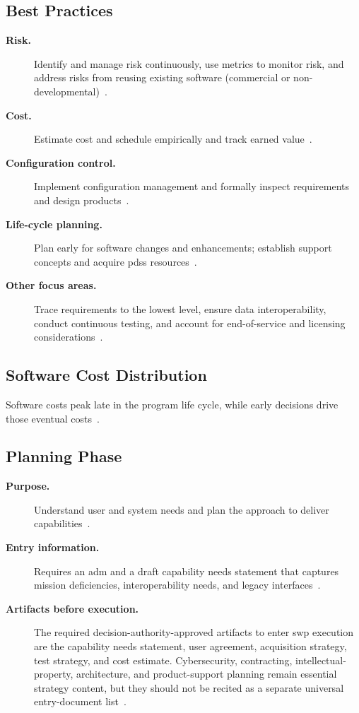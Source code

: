 \documentclass[../main.tex]{subfiles}
\begin{document}
\subsection{Best Practices}
\begin{description}
  \item[\textbf{Risk.}] Identify and manage risk continuously, use metrics to monitor risk, and address risks from reusing existing software (commercial or non-developmental)~\autocite{edo-3-4-2-software-acquisition-management-2025}.
  \item[\textbf{Cost.}] Estimate cost and schedule empirically and track earned value~\autocite{edo-3-4-2-software-acquisition-management-2025}.
  \item[\textbf{Configuration control.}] Implement configuration management and formally inspect requirements and design products~\autocite{edo-3-4-2-software-acquisition-management-2025}.
  \item[\textbf{Life-cycle planning.}] Plan early for software changes and enhancements; establish support concepts and acquire \ac{pdss} resources~\autocite{edo-3-4-2-software-acquisition-management-2025}.
  \item[\textbf{Other focus areas.}] Trace requirements to the lowest level, ensure data interoperability, conduct continuous testing, and account for end-of-service and licensing considerations~\autocite{edo-3-4-2-software-acquisition-management-2025}.
\end{description}

\subsection{Software Cost Distribution}
Software costs peak late in the program life cycle, while early decisions drive those eventual costs~\autocite{edo-3-4-2-software-acquisition-management-2025}.

\subsection{Planning Phase}
\begin{description}
  \item[\textbf{Purpose.}] Understand user and system needs and plan the approach to deliver capabilities~\autocite{edo-3-4-2-software-acquisition-management-2025}.
  \item[\textbf{Entry information.}] Requires an \ac{adm} and a draft capability needs statement that captures mission deficiencies, interoperability needs, and legacy interfaces~\autocite{edo-3-4-2-software-acquisition-management-2025}.
  \item[\textbf{Artifacts before execution.}] The required decision-authority-approved artifacts to enter \ac{swp} execution are the capability needs statement, user agreement, acquisition strategy, test strategy, and cost estimate. Cybersecurity, contracting, intellectual-property, architecture, and product-support planning remain essential strategy content, but they should not be recited as a separate universal entry-document list~\autocite{edo-3-4-2-software-acquisition-management-2025,DoDI5000-87}.
\end{description}
\end{document}
